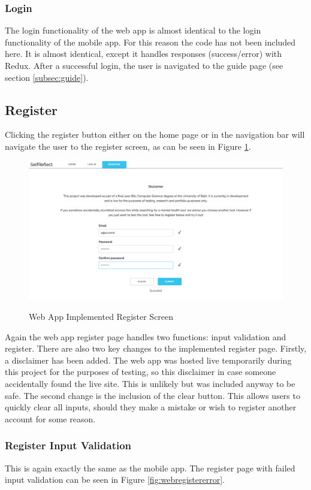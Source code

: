 \documentclass[11pt,openright,a4paper]{report}
\begin{document}
\subsubsection{Login}
The login functionality of the web app is almost identical to the login functionality of the mobile app. For this reason the code has not been included here. It is almost identical, except it handles responses (success/error) with Redux. After a successful login, the user is navigated to the guide page (see section \ref{subsec:guide}).

\subsection{Register}
Clicking the register button either on the home page or in the navigation bar will navigate the user to the register screen, as can be seen in Figure \ref{fig:webregisterimpl}.

\begin{figure}[ht]
\centering
\caption{Web App Implemented Register Screen}
\includegraphics[width=.8\textwidth]{i/webregisterimpl.png}
\label{fig:webregisterimpl}
\end{figure}

Again the web app register page handles two functions: input validation and register. There are also two key changes to the implemented register page. Firstly, a disclaimer has been added. The web app was hosted live temporarily during this project for the purposes of testing, so this disclaimer in case someone accidentally found the live site. This is unlikely but was included anyway to be safe. The second change is the inclusion of the clear button. This allows users to quickly clear all inputs, should they make a mistake or wish to register another account for some reason.

\newpage
\subsubsection{Register Input Validation}
This is again exactly the same as the mobile app. The register page with failed input validation can be seen in Figure \ref{fig:webregistererror}.
\end{document}
